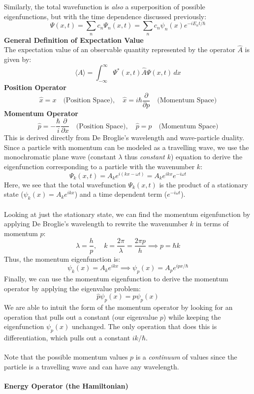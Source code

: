\documentclass[12pt]{article}
\begin{document}
Similarly, the total wavefunction is \textit{also} a superposition of possible eigenfunctions, but with the time dependence discussed previously:
\[\Psi(x,t) =\sum_n c_n \Psi_n(x,t) =\sum_n c_n \psi_n(x) e^{-iE_n t/\hbar}\]
\textbf{General Definition of Expectation Value}\\
The expectation value of an observable quantity represented by the operator $\hat{A}$ is given by:
\[\boxed{\langle A \rangle = \int_{-\infty}^{\infty} \Psi^*(x,t) \hat{A} \Psi(x,t)\, dx}\]
\textbf{Position Operator}
\[\boxed{\hat{x} = x\quad \text{(Position Space)},\quad \hat{x} = i\hbar \frac{\partial}{\partial p}\quad \text{(Momentum Space)}}\]
\textbf{Momentum Operator}
\[\boxed{\hat{p} = -\frac{\hbar}{i} \frac{\partial}{\partial x}\quad \text{(Position Space)},\quad\hat{p} = p\quad \text{(Momentum Space)}}\]
This is derived directly from De Broglie's wavelength and wave-particle duality. Since a particle with momentum can be modeled as a travelling wave, we use the monochromatic plane wave (constant $\lambda$ thus \textit{constant $k$}) equation to derive the eigenfunction corresponding to a particle with the wavenumber $k$:
\[\Psi_k(x,t) = A_k e^{i(kx - \omega t)}=A_k e^{ikx}e^{-i\omega t}\]
Here, we see that the total wavefunction $\Psi_k(x,t)$ is the product of a stationary state ($\psi_k(x)=A_k e^{ikx}$) and a time dependent term ($e^{-i\omega t}$).\\\\
Looking at just the stationary state, we can find the momentum eigenfunction by applying De Broglie's wavelength to rewrite the wavenumber $k$ in terms of momentum $p$:
\[\lambda = \frac{h}{p},\quad k=\frac{2\pi}{\lambda} = \frac{2\pi p}{h}\implies p = \hbar k\]
Thus, the momentum eigenfunction is:
\[\psi_k(x)=A_k e^{ikx}\implies\psi_p(x) = A_p e^{ipx/\hbar}\]
Finally, we can use the momentum eigenfunction to derive the momentum operator by applying the eigenvalue problem:
\[\hat{p} \psi_p(x) = p \psi_p(x)\]
We are able to intuit the form of the momentum operator by looking for an operation that pulls out a constant (our eigenvalue $p$) while keeping the eigenfunction $\psi_p(x)$ unchanged. The only operation that does this is differentiation, which pulls out a constant $ik/\hbar$.\\\\
Note that the possible momentum values $p$ is a \textit{continuum} of values since the particle is a travelling wave and can have any wavelength.\\\\
\textbf{Energy Operator (the Hamiltonian)}\\
\end{document}
